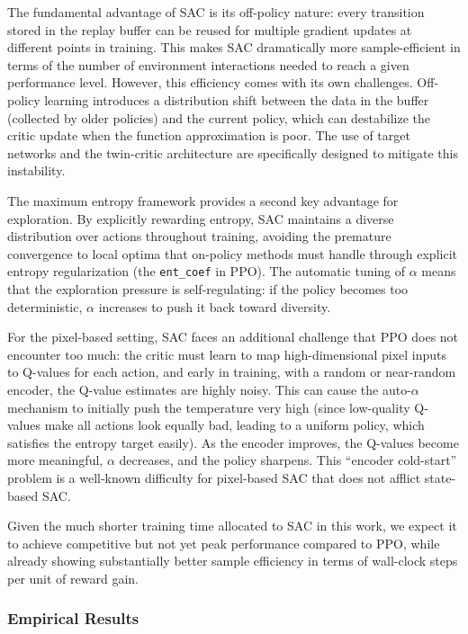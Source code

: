 \documentclass[onecolumn]{cwpreport} %
\begin{document}
The fundamental advantage of SAC is its off-policy nature: every transition stored in the replay buffer can be reused for multiple gradient updates at different points in training. This makes SAC dramatically more sample-efficient in terms of the number of environment interactions needed to reach a given performance level. However, this efficiency comes with its own challenges. Off-policy learning introduces a distribution shift between the data in the buffer (collected by older policies) and the current policy, which can destabilize the critic update when the function approximation is poor. The use of target networks and the twin-critic architecture are specifically designed to mitigate this instability.

The maximum entropy framework provides a second key advantage for exploration. By explicitly rewarding entropy, SAC maintains a diverse distribution over actions throughout training, avoiding the premature convergence to local optima that on-policy methods must handle through explicit entropy regularization (the \texttt{ent\_coef} in PPO). The automatic tuning of $\alpha$ means that the exploration pressure is self-regulating: if the policy becomes too deterministic, $\alpha$ increases to push it back toward diversity.

For the pixel-based setting, SAC faces an additional challenge that PPO does not encounter too much: the critic must learn to map high-dimensional pixel inputs to Q-values for each action, and early in training, with a random or near-random encoder, the Q-value estimates are highly noisy. This can cause the auto-$\alpha$ mechanism to initially push the temperature very high (since low-quality Q-values make all actions look equally bad, leading to a uniform policy, which satisfies the entropy target easily). As the encoder improves, the Q-values become more meaningful, $\alpha$ decreases, and the policy sharpens. This ``encoder cold-start'' problem is a well-known difficulty for pixel-based SAC that does not afflict state-based SAC.

Given the much shorter training time allocated to SAC in this work, we expect it to achieve competitive but not yet peak performance compared to PPO, while already showing substantially better sample efficiency in terms of wall-clock steps per unit of reward gain.

\subsubsection{Empirical Results}
\end{document}
